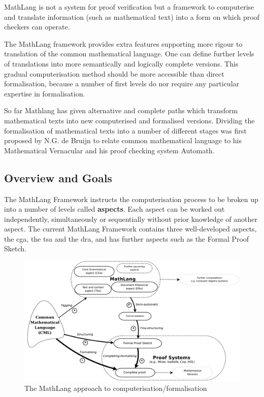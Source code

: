 MathLang is not a system for proof verification but a framework to computerise and translate information (such as mathematical text) into a form on which proof checkers can operate.

The MathLang framework provides extra features supporting more rigour to translation of the common mathematical language. One can define further levels of translations into more semantically and logically complete versions. This gradual computerisation method should be more accessible than direct formalisation, because a number of first levels do nor require any particular expertise in formalisation.

So far Mathlang has given alternative and complete paths which transform mathematical texts into new computerised and formalised versions. Dividing the formalisation of mathematical texts into a number of different stages was first proposed by N.G. de Bruijn to relate common mathematical language to his Mathematical Vernacular \cite{mv} and his proof checking system Automath.

\subsection{Overview and Goals}

The MathLang Framework instructs the computerisation process to be broken up into a number of levels called \textbf{aspects}. Each aspect can be worked out independently, simultaneously or sequentially without prior knowledge of another aspect. The current MathLang Framework contains three well-developed aspects, the \gls{cga}, the \gls{tsa} and the \gls{dra}, and has further aspects such as the Formal Proof Sketch.

\begin{figure}[H]
\begin{center}
\includegraphics[scale=0.255]{Figures/Background/mathlang.png}
\end{center}
\caption{The MathLang approach to computerisation/formalisation \cite{mathintomizar}\label{fig:mathlang}}
\end{figure}

